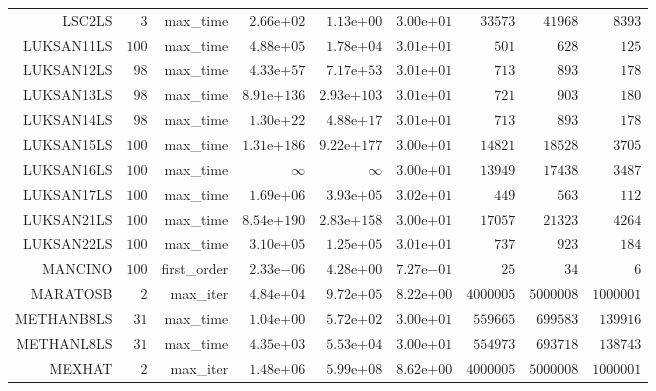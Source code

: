 \begin{longtable}{rrrrrrrrr}
LSC2LS & \(     3\) & max\_time & \( 2.66\)e\(+02\) & \( 1.13\)e\(+00\) & \( 3.00\)e\(+01\) & \( 33573\) & \( 41968\) & \(  8393\) \\
LUKSAN11LS & \(   100\) & max\_time & \( 4.88\)e\(+05\) & \( 1.78\)e\(+04\) & \( 3.01\)e\(+01\) & \(   501\) & \(   628\) & \(   125\) \\
LUKSAN12LS & \(    98\) & max\_time & \( 4.33\)e\(+57\) & \( 7.17\)e\(+53\) & \( 3.01\)e\(+01\) & \(   713\) & \(   893\) & \(   178\) \\
LUKSAN13LS & \(    98\) & max\_time & \(8.91\)e\(+136\) & \(2.93\)e\(+103\) & \( 3.01\)e\(+01\) & \(   721\) & \(   903\) & \(   180\) \\
LUKSAN14LS & \(    98\) & max\_time & \( 1.30\)e\(+22\) & \( 4.88\)e\(+17\) & \( 3.01\)e\(+01\) & \(   713\) & \(   893\) & \(   178\) \\
LUKSAN15LS & \(   100\) & max\_time & \(1.31\)e\(+186\) & \(9.22\)e\(+177\) & \( 3.00\)e\(+01\) & \( 14821\) & \( 18528\) & \(  3705\) \\
LUKSAN16LS & \(   100\) & max\_time & \(\infty\) & \(\infty\) & \( 3.00\)e\(+01\) & \( 13949\) & \( 17438\) & \(  3487\) \\
LUKSAN17LS & \(   100\) & max\_time & \( 1.69\)e\(+06\) & \( 3.93\)e\(+05\) & \( 3.02\)e\(+01\) & \(   449\) & \(   563\) & \(   112\) \\
LUKSAN21LS & \(   100\) & max\_time & \(8.54\)e\(+190\) & \(2.83\)e\(+158\) & \( 3.00\)e\(+01\) & \( 17057\) & \( 21323\) & \(  4264\) \\
LUKSAN22LS & \(   100\) & max\_time & \( 3.10\)e\(+05\) & \( 1.25\)e\(+05\) & \( 3.01\)e\(+01\) & \(   737\) & \(   923\) & \(   184\) \\
MANCINO & \(   100\) & first\_order & \( 2.33\)e\(-06\) & \( 4.28\)e\(+00\) & \( 7.27\)e\(-01\) & \(    25\) & \(    34\) & \(     6\) \\
MARATOSB & \(     2\) & max\_iter & \( 4.84\)e\(+04\) & \( 9.72\)e\(+05\) & \( 8.22\)e\(+00\) & \(4000005\) & \(5000008\) & \(1000001\) \\
METHANB8LS & \(    31\) & max\_time & \( 1.04\)e\(+00\) & \( 5.72\)e\(+02\) & \( 3.00\)e\(+01\) & \(559665\) & \(699583\) & \(139916\) \\
METHANL8LS & \(    31\) & max\_time & \( 4.35\)e\(+03\) & \( 5.53\)e\(+04\) & \( 3.00\)e\(+01\) & \(554973\) & \(693718\) & \(138743\) \\
MEXHAT & \(     2\) & max\_iter & \( 1.48\)e\(+06\) & \( 5.99\)e\(+08\) & \( 8.62\)e\(+00\) & \(4000005\) & \(5000008\) & \(1000001\) \\

\end{longtable}
